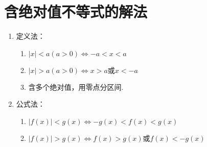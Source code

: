 \section{含绝对值不等式的解法}
\begin{enumerate}
	\item 定义法：\begin{enumerate}
		\item $|x|<a(a>0)\Leftrightarrow -a<x<a$
		\item $|x|>a(a>0)\Leftrightarrow  x>a\text{或} x<-a$ 
		\item 含多个绝对值，用零点分区间.
	\end{enumerate}
	\item 公式法：\begin{enumerate}
		\item $|f(x)|<g(x)\Leftrightarrow -g(x)<f(x)<g(x)$
		\item $|f(x)|>g(x)\Leftrightarrow  f(x)>g(x)\text{或} f(x)<-g(x)$
	\end{enumerate}
\end{enumerate}
